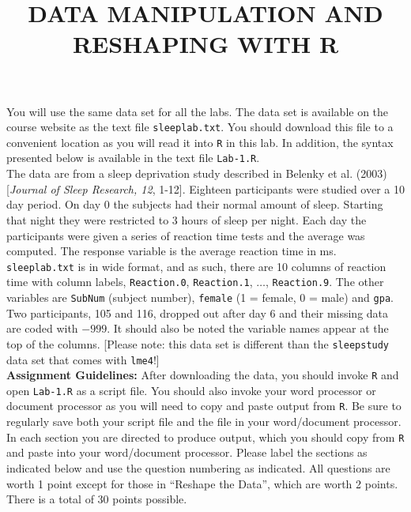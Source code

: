 \documentclass[]{article}
\title{DATA MANIPULATION AND RESHAPING WITH R}
\author{}
\date{}
\begin{document}
\maketitle 
\thispagestyle{fancy}

\noindent You will use the same data set for all the labs. The data set is available on the course website as the text file \texttt{sleeplab.txt}. You should download this file to a convenient location as you will read it into \texttt{R} in this lab. In addition, the syntax presented below is available in the text file \texttt{Lab-1.R}.\\
\linebreak
The data are from a sleep deprivation study described in Belenky et al. (2003) [\emph{Journal of Sleep Research, 12}, 1-12].  Eighteen participants were studied over a 10 day period. On day 0 the subjects had their normal amount of sleep. Starting that night they were restricted to 3 hours of sleep per night. Each day the participants were given a series of reaction time tests and the average was computed. The response variable is the average reaction time in ms. \texttt{sleeplab.txt} is in wide format, and as such, there are 10 columns of reaction time with column labels, \texttt{Reaction.0}, \texttt{Reaction.1}, $\ldots$, \texttt{Reaction.9}.  The other variables are \texttt{SubNum} (subject number), \texttt{female} (1 = female, 0 = male) and \texttt{gpa}. Two participants, 105 and 116, dropped out after day 6 and their missing data are coded with $-999$. It should also be noted the variable names appear at the top of the columns. [Please note: this data set is different than the \texttt{sleepstudy} data set that comes with \texttt{lme4}!]\\
\linebreak
\textbf{Assignment Guidelines:} After downloading the data, you should invoke \texttt{R} and open \texttt{Lab-1.R} as a script file. You should also invoke your word processor or document processor as you will need to copy and paste output from \texttt{R}. Be sure to
regularly save both your script file and the file in your word/document processor.
\linebreak
\noindent In each section you are directed to produce output, which you should copy from \texttt{R} and paste into your word/document processor. Please label the sections as indicated below and use the question numbering as indicated. All questions are worth 1 point except for those in ``Reshape the Data'', which are worth 2 points. There is a total of 30 points possible.
\pagebreak
\end{document}
